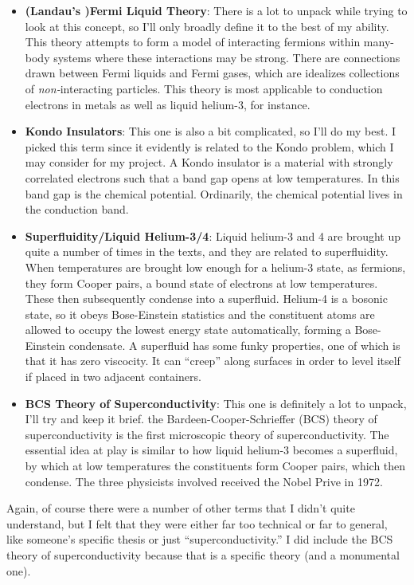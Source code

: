 \begin{itemize}
\item \textbf{(Landau's )Fermi Liquid Theory}: There is a lot to unpack while trying to look at this concept, so I'll only broadly define it to the best of my ability. This theory attempts to form a model of interacting fermions within many-body systems where these interactions may be strong. There are connections drawn between Fermi liquids and Fermi gases, which are idealizes collections of \textit{non-}interacting particles. This theory is most applicable to conduction electrons in metals as well as liquid helium-3, for instance.

\item \textbf{Kondo Insulators}: This one is also a bit complicated, so I'll do my best. I picked this term since it evidently is related to the Kondo problem, which I may consider for my project. A Kondo insulator is a material with strongly correlated electrons such that a band gap opens at low temperatures. In this band gap is the chemical potential. Ordinarily, the chemical potential lives in the conduction band.

\item \textbf{Superfluidity/Liquid Helium-3/4}: Liquid helium-3 and 4 are brought up quite a number of times in the texts, and they are related to superfluidity. When temperatures are brought low enough for a helium-3 state, as fermions, they form Cooper pairs, a bound state of electrons at low temperatures. These then subsequently condense into a superfluid. Helium-4 is a bosonic state, so it obeys Bose-Einstein statistics and the constituent atoms are allowed to occupy the lowest energy state automatically, forming a Bose-Einstein condensate. A superfluid has some funky properties, one of which is that it has zero viscocity. It can ``creep'' along surfaces in order to level itself if placed in two adjacent containers.

\item \textbf{BCS Theory of Superconductivity}: This one is definitely a lot to unpack, I'll try and keep it brief. the Bardeen-Cooper-Schrieffer (BCS) theory of superconductivity is the first microscopic theory of superconductivity. The essential idea at play is similar to how liquid helium-3 becomes a superfluid, by which at low temperatures the constituents form Cooper pairs, which then condense. The three physicists involved received the Nobel Prive in 1972.

\end{itemize}

Again, of course there were a number of other terms that I didn't quite understand, but I felt that they were either far too technical or far to general, like someone's specific thesis or just ``superconductivity.'' I did include the BCS theory of superconductivity because that is a specific theory (and a monumental one).


